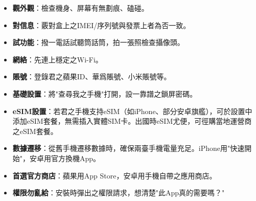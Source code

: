

\begin{itemize}
  \item \textbf{觀外觀}：檢查機身、屏幕有無劃痕、磕碰。
  \item \textbf{對信息}：覈對盒上之IMEI/序列號與發票上者為否一致。
  \item \textbf{試功能}：撥一電話試聽筒話筒，拍一張照檢查攝像頭。
\end{itemize}


\begin{itemize}
  \item \textbf{網絡}：先連上穩定之Wi-Fi。
  \item \textbf{賬號}：登錄君之蘋果ID、華爲賬號、小米賬號等。
  \item \textbf{基礎設置}：將"查尋我之手機"打開，設一靠譜之鎖屏密碼。
  \item \textbf{eSIM設置}：若君之手機支持eSIM（如iPhone、部分安卓旗艦），可於設置中添加eSIM套餐，無需插入實體SIM卡。出國時eSIM尤便，可徑購當地運營商之eSIM套餐。
  \item \textbf{數據遷移}：從舊手機遷移數據時，確保兩臺手機電量充足。iPhone用"快速開始"，安卓用官方換機App。
\end{itemize}


\begin{itemize}
  \item \textbf{首選官方商店}：蘋果用App Store，安卓用手機自帶之應用商店。
  \item \textbf{權限勿亂給}：安裝時彈出之權限請求，想清楚"此App真的需要嗎？"
\end{itemize}
